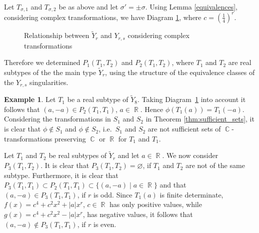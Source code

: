 \documentclass[noend]{amsproc}
\theoremstyle{definition}
\newtheorem{example}[theorem]{Example}
\DeclareMathOperator{\R}{\mathbb{R}}
\DeclareMathOperator{\C}{\mathbb{C}}
\begin{document}
Let $T_{\sigma,1}$ and $T_{\sigma,2}$ be as above and let $\sigma'=\pm\sigma$.
Using Lemma \ref{equivalences}, considering complex transformations, we have
Diagram \ref{Yr_commuting_diagram}, where $c=\left(\frac{1}{4}\right)^r$.

\begin{figure}
\caption{Relationship between $\widetilde Y_r$ and $Y_{r,s}$ considering
complex transformations}
\label{Yr_commuting_diagram}
\end{figure}
Therefore we determined $P_1(T_1,T_2)$ and $P_2(T_1,T_2)$, where $T_1$ and
$T_2$ are real subtypes of the the main type $\widetilde Y_r$, using the
structure of the equivalence classes of the $Y_{r,s}$ singularities.

\begin{example}\label{tab:counter_example_Yr}
Let $T_1$ be a real subtype of $\widetilde Y_8$. Taking
Diagram~\ref{Yr_commuting_diagram} into account it follows that
$(a,-a)\in P_2(T_1,T_1)$, $a\in\R$. Hence $\phi(T_1(a))=T_1(-a)$. Considering
the transformations in $S_1$ and $S_2$ in Theorem \ref{thm:sufficient_sets}, it
is clear that $\phi\not\in S_1$ and $\phi\not\in S_2$, i.e.~$S_1$ and $S_2$ are
not sufficient sets of $\C$-transformations preserving $\C$ or $\R$ for $T_1$
and $T_1$.
\end{example}

Let $T_1$ and $T_2$ be real subtypes of $\widetilde Y_r$ and let $a\in\R$. We
now consider $P_3(T_1,T_2)$. It is clear that $P_3(T_1,T_2)=\varnothing$, if
$T_1$ and $T_2$ are not of the same subtype. Furthermore, it is clear that
$P_3(T_1,T_1)\subset P_2(T_1,T_1)\subset\{(a,-a)\mid a\in\R\}$ and that
$(a,-a)\in P_3(T_1,T_1)$, if $r$ is odd. Since $T_1(a)$ is finite determinate,
$f(x)=c^4+c^2x^2+|a|x^r$, $c\in\R$ has only positive values, while
$g(x)=c^4+c^2x^2-|a|x^r$, has negative values, it follows that
$(a,-a)\not\in P_3(T_1,T_1)$, if $r$ is even.
\end{document}
